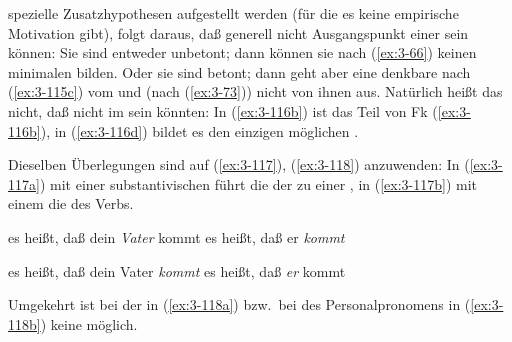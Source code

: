 \documentclass[output=paper]{langsci/langscibook}
\begin{document}
spezielle Zusatzhypothesen aufgestellt werden (für die es keine empirische Motivation gibt), folgt daraus, daß 
generell nicht Ausgangspunkt einer  sein können: Sie sind entweder unbetont; dann können sie nach (\ref{ex:3-66}) keinen minimalen
 bilden. Oder sie sind betont; dann geht aber eine denkbare  nach (\ref{ex:3-115c}) vom  und (nach (\ref{ex:3-73})) nicht von
ihnen aus. Natürlich heißt das nicht, daß  nicht im  sein könnten: In (\ref{ex:3-116b}) ist das  Teil von Fk
(\ref{ex:3-116b}), in (\ref{ex:3-116d}) bildet es den einzigen möglichen .

Dieselben Überlegungen sind auf (\ref{ex:3-117}), (\ref{ex:3-118}) anzuwenden: In (\ref{ex:3-117a}) mit einer substantivischen  führt die  der  zu einer
, in (\ref{ex:3-117b}) mit einem  die 
des Verbs.
\begin{exe}
\ex
\label{ex:3-117}
\begin{xlist}
\ex
\label{ex:3-117a}
es heißt, daß dein \textit{Vater} kommt
\ex
\label{ex:3-117b}
es heißt, daß er \textit{kommt}
\end{xlist}
\ex
\label{ex:3-118}
\begin{xlist}
\ex
\label{ex:3-118a}
es heißt, daß dein Vater \textit{kommt}
\ex
\label{ex:3-118b}
es heißt, daß \textit{er} kommt
\end{xlist}
\end{exe}
Umgekehrt ist bei der  in (\ref{ex:3-118a}) bzw.\ bei 
des Personalpronomens in (\ref{ex:3-118b}) keine  möglich.
\end{document}
